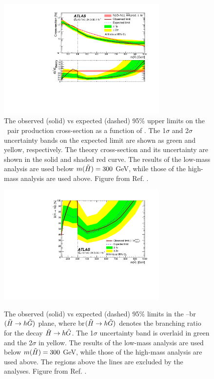 \begin{figure}[htbp]
	\centering
\includegraphics[width=0.75\textwidth]{figures/ewk_prod/interpretation/GGMupperLimit_unblinded_jump}
	\caption{The observed (solid) vs expected (dashed) 95\% upper limits on the \hino\ pair production cross-section as a function of \mhino.  The 1$\sigma$ and 2$\sigma$ uncertainty bands on the expected limit are shown as green and yellow, respectively. The theory cross-section and its uncertainty are shown in the solid and shaded red curve.
   The results of the low-mass analysis are used below $m(\tilde{H}) = 300$ GeV, while those of the high-mass analysis are used above. 
   Figure from Ref. \cite{Aaboud:2018htj}. } 
	\label{fig:ewk:exclusion_comb}
\end{figure}


\begin{figure}[htbp]    
	\centering    
    \includegraphics[width=0.75\textwidth]{figures/ewk_prod/interpretation/my_br_plot_unblind_yellow_band}\label{fig:exclusion_br}
	\caption{The observed (solid) vs expected (dashed) 95\% limits in the \mhino--\gls{br}$(\tilde{H}\rightarrow h \tilde{G})$ plane, where \gls{br}$(\tilde{H}\rightarrow h \tilde{G})$ denotes the branching ratio for the decay $\tilde{H} \rightarrow h \tilde{G}$. The 1$\sigma$ uncertainty band is overlaid in green and the 2$\sigma$ in yellow.
	The results of the low-mass analysis are used below $m(\tilde{H}) = 300$ GeV, while those of the high-mass analysis are used above.
	 The regions above the lines are excluded by the analyses. Figure from Ref. \cite{Aaboud:2018htj}. } 
	\label{fig:ewk:exclusion_combBR}
\end{figure}


